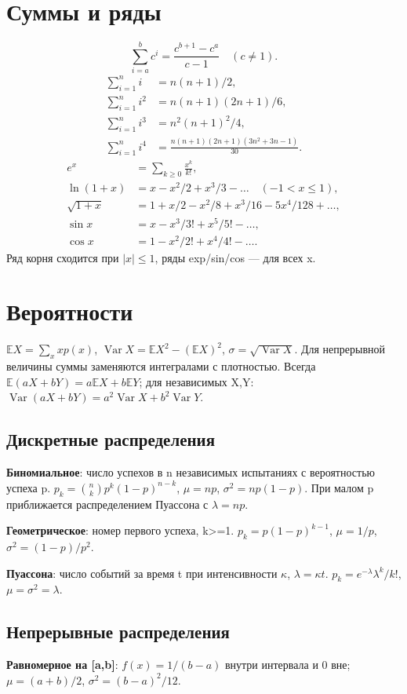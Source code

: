 \section{Суммы и ряды}
\[\sum_{i=a}^bc^i=\frac{c^{b+1}-c^a}{c-1}\quad(c\ne1).\]
\begin{align*}
\sum_{i=1}^n i&=n(n+1)/2,\\
\sum_{i=1}^n i^2&=n(n+1)(2n+1)/6,\\
\sum_{i=1}^n i^3&=n^2(n+1)^2/4,\\
\sum_{i=1}^n i^4&=\frac{n(n+1)(2n+1)(3n^2+3n-1)}{30}.
\end{align*}
\begin{align*}
e^x&=\sum_{k\ge0}\frac{x^k}{k!},\\
\ln(1+x)&=x-x^2/2+x^3/3-\dots\quad(-1<x\le1),\\
\sqrt{1+x}&=1+x/2-x^2/8+x^3/16-5x^4/128+\dots,\\
\sin x&=x-x^3/3!+x^5/5!-\dots,\\
\cos x&=1-x^2/2!+x^4/4!-\dots.
\end{align*}
Ряд корня сходится при $|x|\le1$, ряды exp/sin/cos — для всех x.
\section{Вероятности}
$\mathbb EX=\sum_x xp(x)$,
$\operatorname{Var}X=\mathbb EX^2-(\mathbb EX)^2$,
$\sigma=\sqrt{\operatorname{Var}X}$.
Для непрерывной величины суммы заменяются интегралами с плотностью.
Всегда $\mathbb E(aX+bY)=a\mathbb EX+b\mathbb EY$;
для независимых X,Y:
$\operatorname{Var}(aX+bY)=a^2\operatorname{Var}X+b^2\operatorname{Var}Y$.
\subsection{Дискретные распределения}
\textbf{Биномиальное}: число успехов в n независимых испытаниях
с вероятностью успеха p.
$p_k=\binom nkp^k(1-p)^{n-k}$,
$\mu=np$, $\sigma^2=np(1-p)$.
При малом p приближается распределением Пуассона с $\lambda=np$.

\textbf{Геометрическое}: номер первого успеха, k>=1.
$p_k=p(1-p)^{k-1}$, $\mu=1/p$, $\sigma^2=(1-p)/p^2$.

\textbf{Пуассона}: число событий за время t при интенсивности
$\kappa$, $\lambda=\kappa t$.
$p_k=e^{-\lambda}\lambda^k/k!$, $\mu=\sigma^2=\lambda$.
\subsection{Непрерывные распределения}
\textbf{Равномерное на [a,b]}:
$f(x)=1/(b-a)$ внутри интервала и 0 вне;
$\mu=(a+b)/2$, $\sigma^2=(b-a)^2/12$.

